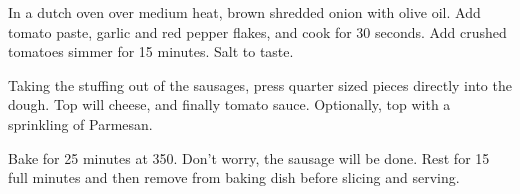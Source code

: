 \begin{recipe}
In a dutch oven over medium heat, brown shredded onion with olive oil. Add tomato paste, garlic and red pepper flakes, and cook for 30 seconds. Add crushed tomatoes simmer for 15 minutes. Salt to taste.


Taking the stuffing out of the sausages, press quarter sized pieces directly into the dough. Top will cheese, and finally tomato sauce. Optionally, top with a sprinkling of Parmesan.

Bake for 25 minutes at 350. Don't worry, the sausage will be done. Rest for 15 full minutes and then remove from baking dish before slicing and serving.


\end{recipe}
